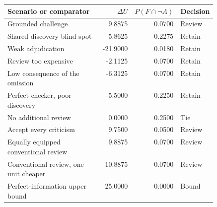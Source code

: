 \begin{tabular}{@{}p{0.49\linewidth}rrl@{}}
\toprule
Scenario or comparator & $\Delta U$ & $P(F\cap\neg A)$ & Decision \\
\midrule
Grounded challenge & 9.8875 & 0.0700 & Review \\
Shared discovery blind spot & -5.8625 & 0.2275 & Retain \\
Weak adjudication & -21.9000 & 0.0180 & Retain \\
Review too expensive & -2.1125 & 0.0700 & Retain \\
Low consequence of the omission & -6.3125 & 0.0700 & Retain \\
Perfect checker, poor discovery & -5.5000 & 0.2250 & Retain \\
\midrule
No additional review & 0.0000 & 0.2500 & Tie \\
Accept every criticism & 9.7500 & 0.0500 & Review \\
Equally equipped conventional review & 9.8875 & 0.0700 & Review \\
Conventional review, one unit cheaper & 10.8875 & 0.0700 & Review \\
Perfect-information upper bound & 25.0000 & 0.0000 & Bound \\
\bottomrule
\end{tabular}
